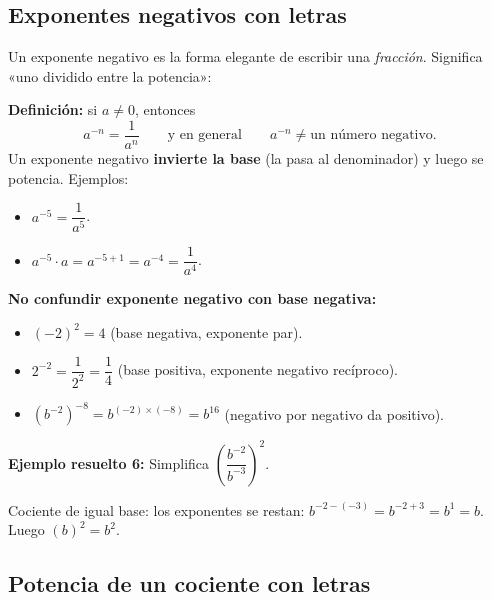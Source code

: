 \documentclass[12pt, letterpaper]{article}
\begin{document}
\subsection{Exponentes negativos con letras}

Un exponente negativo es la forma elegante de escribir una \emph{fracción}. Significa «uno dividido entre la potencia»:

\begin{cuadroteoria}
  \textbf{Definición:} si $a \neq 0$, entonces
  \[
    a^{-n} = \frac{1}{a^n} \qquad \text{y en general} \qquad a^{-n} \neq \text{un número negativo}.
  \]
  Un exponente negativo \textbf{invierte la base} (la pasa al denominador) y luego se potencia. Ejemplos:
  \begin{itemize}
    \item $a^{-5} = \dfrac{1}{a^5}$.
    \item $a^{-5} \cdot a = a^{-5+1} = a^{-4} = \dfrac{1}{a^4}$.
  \end{itemize}
\end{cuadroteoria}

\begin{cuadroadvertencia}
  \textbf{No confundir exponente negativo con base negativa:}
  \begin{itemize}
    \item $(-2)^2 = 4$ (base negativa, exponente par).
    \item $2^{-2} = \dfrac{1}{2^2} = \dfrac{1}{4}$ (base positiva, exponente negativo \textrightarrow recíproco).
    \item $(b^{-2})^{-8} = b^{(-2) \times (-8)} = b^{16}$ (negativo por negativo da positivo).
  \end{itemize}
\end{cuadroadvertencia}

\noindent\textbf{Ejemplo resuelto 6:} Simplifica $\left(\dfrac{b^{-2}}{b^{-3}}\right)^{2}$.

Cociente de igual base: los exponentes se restan: $b^{-2 - (-3)} = b^{-2+3} = b^1 = b$. Luego $(b)^2 = b^2$.

\subsection{Potencia de un cociente con letras}
\end{document}
